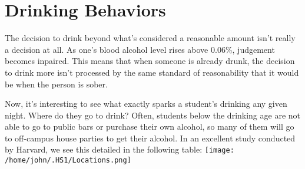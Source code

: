 \documentclass[12pt, doc]{apa6}
\begin{document}
\section{Drinking Behaviors}
The decision to drink beyond what's considered a reasonable amount isn't really a decision at all. As one's blood alcohol level rises above 0.06\%, judgement becomes inpaired. This means that when someone is already drunk, the decision to drink more isn't processed by the same standard of reasonability that it would be when the person is sober.

Now, it's interesting to see what exactly sparks a student's drinking any given night. Where do they go to drink? Often, students below the drinking age are not able to go to public bars or purchase their own alcohol, so many of them will go to off-campus house parties to get their alcohol. In an excellent study conducted by Harvard, we see this detailed in the following table:
\texttt{[image: /home/john/.HS1/Locations.png]}
\end{document}
